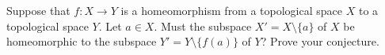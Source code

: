 \item Suppose that $f : X \to Y$ is a homeomorphism from a topological space $X$ to a topological space $Y$. Let $a \in X$. Must the subspace $X' = X \setminus \{a\}$ of $X$ be homeomorphic to the subspace $Y' = Y \setminus \{f(a)\}$ of $Y$? Prove your conjecture. 

\begin{comment}

\ExerciseSolution The answer is yes. Assume that $f : X \to Y$ is a homeomorphism from a topological space $X$ to a topological space $Y$. Let $a \in X$, and let $X' = X \setminus \{a\}$ and $Y' = Y \setminus \{f(a)\}$. Define $g$ by $g(x) = f(x)$ for all $x \in X'$. Note that the fact that $f$ is an injection shows that $g(x) \neq f(a)$ for any $x \in X'$. Thus, $g : X' \to Y'$. We will prove that $g$ is a homeomorphism, which will imply that $X'$ and $Y'$ are homeomorphic spaces. First we show that $g$ is an injection. 

Let $x_1, x_2 \in X'$ such that $g(x_1) = g(x_2)$. Then $f(x_1) = f(x_2)$. The fact that $f$ is an injection means that $x_1 = x_2$ and so $g$ is an injection. Next we demonstrate that $g$ is a surjection.

Let $y \in Y'$. The fact that $f$ is a surjection implies that there is an $x \in X$ such that $f(x) = y$. Now $y \neq f(a)$, so the fact that $f$ is an injection means that $x \neq a$. Thus, $x \in X'$ and $g$ is a surjection. So $g$ is a bijection from $X'$ to $Y'$. 

Now we need to prove that $g$ and $g^{-1}$ are homeomorphisms. Since $g^{-1}$ is defined by $g^{-1}(y) = f^{-1}(y)$ for all $y \in Y'$, the same argument will work for either $g$ or $g^{-1}$. We demonstrate that $g$ is continuous. Let $O'$ be an open set in $Y'$. Then $O' = O \cap Y'$ for some open set $O$ in $Y$. We know that $f$ is continuous, so $f^{-1}(O)$ is an open set in $X$. Thus, $f^{-1}(O) \cap X'$ is an open set in $X'$. All that remains to do is show that $g^{-1}(O') = f^{-1}(O) \cap X'$. 

Let $x \in g^{-1}(O')$. Then $g(x) \in O' \subseteq O$ and $g(x) \neq f(a)$. Thus, $x \in f^{-1}(O) \cap X'$. Now let $x \in f^{-1}(O) \cap X'$. Then $x \in X'$ and $f(x) = g(x) \in O$. But $x \in X'$ implies $x \neq a$ and so $f(x) = g(x) \in Y'$. So $g(x) \in O \cap Y' = O'$ and so $x \in g^{-1}(O')$. Thus, $g^{-1}(O')$ is an open set in $X$ and $g$ is a continuous function. 

\end{comment}



